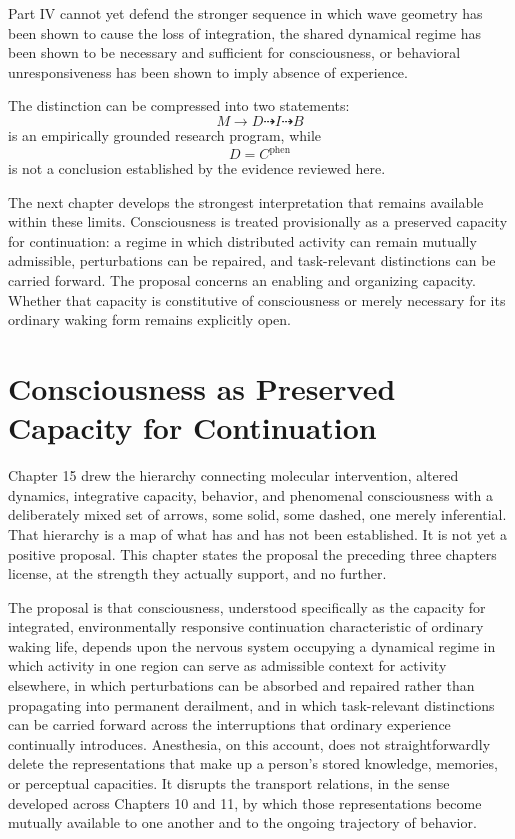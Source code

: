 \documentclass[11pt]{book}
\begin{document}
Part IV cannot yet defend the stronger sequence in which wave geometry has been shown to cause the loss of integration, the shared dynamical regime has been shown to be necessary and sufficient for consciousness, or behavioral unresponsiveness has been shown to imply absence of experience.

The distinction can be compressed into two statements:
\[
\boxed{
M\longrightarrow D
\dashrightarrow I
\dashrightarrow B
}
\]
is an empirically grounded research program, while
\[
\boxed{
D=C^{\mathrm{phen}}
}
\]
is not a conclusion established by the evidence reviewed here.

The next chapter develops the strongest interpretation that remains available within these limits. Consciousness is treated provisionally as a preserved capacity for continuation: a regime in which distributed activity can remain mutually admissible, perturbations can be repaired, and task-relevant distinctions can be carried forward. The proposal concerns an enabling and organizing capacity. Whether that capacity is constitutive of consciousness or merely necessary for its ordinary waking form remains explicitly open.

\chapter{Consciousness as Preserved Capacity for Continuation}

Chapter 15 drew the hierarchy connecting molecular intervention, altered dynamics, integrative capacity, behavior, and phenomenal consciousness with a deliberately mixed set of arrows, some solid, some dashed, one merely inferential. That hierarchy is a map of what has and has not been established. It is not yet a positive proposal. This chapter states the proposal the preceding three chapters license, at the strength they actually support, and no further.

The proposal is that consciousness, understood specifically as the capacity for integrated, environmentally responsive continuation characteristic of ordinary waking life, depends upon the nervous system occupying a dynamical regime in which activity in one region can serve as admissible context for activity elsewhere, in which perturbations can be absorbed and repaired rather than propagating into permanent derailment, and in which task-relevant distinctions can be carried forward across the interruptions that ordinary experience continually introduces. Anesthesia, on this account, does not straightforwardly delete the representations that make up a person's stored knowledge, memories, or perceptual capacities. It disrupts the transport relations, in the sense developed across Chapters 10 and 11, by which those representations become mutually available to one another and to the ongoing trajectory of behavior.
\end{document}
